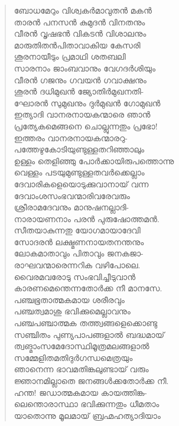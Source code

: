 \begin{verse}
ബോധമേറും വിശ്വകര്‍മാവുതന്‍ മകന്‍\\
താരന്‍ പനസന്‍ കുമുദന്‍ വിനതനും\\
വീരന്‍ വൃഷഭന്‍ വികടന്‍ വിശാലനും\\
മാരുതിതന്‍പിതാവാകിയ കേസരി\\
ശൂരനായീടും പ്രമാഥി ശതബലി\\
സാരനാം ജാംബവാനും വേഗദര്‍ശിയും\\
വീരന്‍ ഗജനും ഗവയന്‍ ഗവാക്ഷനും\\
ശൂരന്‍ ദധിമുഖന്‍ ജ്യോതിര്‍മുഖനതി-\\
ഘോരന്‍ സുമുഖനും ദുര്‍മുഖന്‍ ഗോമുഖന്‍\\
ഇത്യാദി വാനരനായകന്മാരെ ഞാന്‍\\
പ്രത്യേകമെങ്ങനെ ചൊല്ലുന്നതും പ്രഭോ!\\
ഇത്തരം വാനരനായകന്മാരറു-\\
പത്തേഴുകോടിയുണ്ടുള്ളതറിഞ്ഞാലും\\
ഉള്ളം തെളിഞ്ഞു പോര്‍ക്കായിരുപത്തൊന്നു\\
വെള്ളം പടയുമുണ്ടുള്ളതവര്‍ക്കെല്ലാം\\
ദേവാരികളെയൊടുക്കുവാനായ് വന്ന\\
ദേവാംശസംഭവന്മാരിവരേവരും\\
ശ്രീരാമദേവനും മാനുഷനല്ലാദി-\\
നാരായണനാം പരന്‍ പുരുഷോത്തമന്‍.\\
സീതയാകുന്നതു യോഗമായാദേവി\\
സോദരന്‍ ലക്ഷ്മണനായതനന്തനും\\
ലോകമാതാവും പിതാവും ജനകജാ-\\
രാഘവന്മാരെന്നറിക വഴിപോലെ.\\
വൈരമവരോടു സംഭവിച്ചീടുവാന്‍\\
കാരണമെന്തെന്നതോര്‍ക്ക നീ മാനസേ.\\
പഞ്ചഭൂതാത്മകമായ ശരീരവും\\
പഞ്ചത്വമാശു ഭവിക്കുമെല്ലാവനും\\
പഞ്ചപഞ്ചാത്മക തത്ത്വങ്ങളെക്കൊണ്ടു\\
സഞ്ചിതം പുണ്യപാപങ്ങളാല്‍ ബദ്ധമായ്\\
ത്വങ്മാംസമേദോസ്ഥിമൂത്രമലങ്ങളാല്‍\\
സമ്മേളിതമതിദുര്‍ഗന്ധമെത്രയും\\
ഞാനെന്ന ഭാവമതിങ്കലുണ്ടായ് വരും\\
ജ്ഞാനമില്ലാതെ ജനങ്ങള്‍ക്കതോര്‍ക്ക നീ.\\
ഹന്ത! ജഡാത്മകമായ കായത്തിങ്ക-\\
ലെന്തൊരാസ്ഥാ ഭവിക്കുന്നതും ധീമതാം\\
യാതൊന്നു മൂലമായ് ബ്രഹ്മഹത്യാദിയാം\\

\end{verse}
